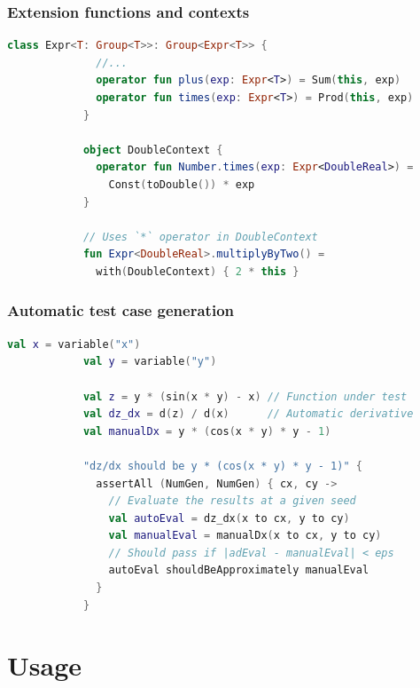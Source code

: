 \documentclass{beamer}
\begin{document}
    \begin{frame}[fragile]
        \frametitle{Extension functions and contexts}
        \begin{lstlisting}[language=Kotlin, gobble=12]
            class Expr<T: Group<T>>: Group<Expr<T>> {
              //...
              operator fun plus(exp: Expr<T>) = Sum(this, exp)
              operator fun times(exp: Expr<T>) = Prod(this, exp)
            }

            object DoubleContext {
              operator fun Number.times(exp: Expr<DoubleReal>) =
                Const(toDouble()) * exp
            }

            // Uses `*` operator in DoubleContext
            fun Expr<DoubleReal>.multiplyByTwo() =
              with(DoubleContext) { 2 * this }
        \end{lstlisting}
    \end{frame}

    \begin{frame}[fragile]
        \frametitle{Automatic test case generation}
        \begin{lstlisting}[language=Kotlin, gobble=12]
            val x = variable("x")
            val y = variable("y")

            val z = y * (sin(x * y) - x) // Function under test
            val dz_dx = d(z) / d(x)      // Automatic derivative
            val manualDx = y * (cos(x * y) * y - 1)

            "dz/dx should be y * (cos(x * y) * y - 1)" {
              assertAll (NumGen, NumGen) { cx, cy ->
                // Evaluate the results at a given seed
                val autoEval = dz_dx(x to cx, y to cy)
                val manualEval = manualDx(x to cx, y to cy)
                // Should pass if |adEval - manualEval| < eps
                autoEval shouldBeApproximately manualEval
              }
            }
        \end{lstlisting}
    \end{frame}

    \section{Usage}\label{sec:fourth-section}
\end{document}
